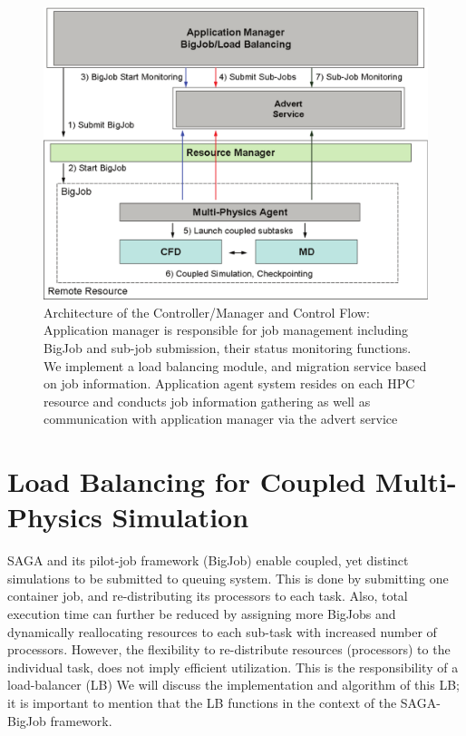 \documentclass[conference,final]{IEEEtran}
\begin{document}
\begin{figure}
\centering
\includegraphics[scale=0.38]{Structure_of_BigJob}
\caption{\small Architecture of the Controller/Manager and Control Flow: Application manager is responsible for job management including BigJob and sub-job submission, their status monitoring functions. We implement a load balancing module, and migration service based on job information. Application agent system resides on each HPC resource and conducts job information gathering as well as communication with application manager via the advert service}
\label{Fig:BigJob_Structure}
\end{figure}



\section{Load Balancing for Coupled Multi-Physics Simulation}


SAGA and its pilot-job framework (BigJob) enable coupled, yet distinct
simulations to be
submitted to queuing system. This is done by submitting one container
job, and re-distributing its processors to each task. Also, total
execution time can further be reduced by assigning more BigJobs and
dynamically reallocating resources to each sub-task with increased
number of processors. However, the flexibility to re-distribute
resources (processors) to the individual task, does not imply
efficient utilization. This is the responsibility of a load-balancer
(LB) We will discuss the implementation and algorithm of this LB; it
is important to mention that the LB functions in the context of the
SAGA-BigJob framework.
\end{document}

